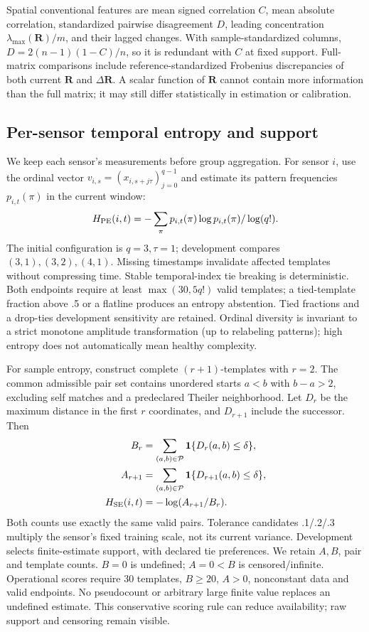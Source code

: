 \documentclass[conference]{IEEEtran}
\newcommand{\R}{\mathbf R}
\begin{document}
Spatial conventional features are mean signed correlation $C$, mean absolute
correlation, standardized pairwise disagreement $D$, leading concentration
$\lambda_{\max}(\R)/m$, and their lagged changes. With sample-standardized
columns, $D=2(n-1)(1-C)/n$, so it is redundant with $C$ at fixed support.
Full-matrix comparisons include reference-standardized Frobenius discrepancies
of both current $\R$ and $\Delta\R$. A scalar function of $\R$ cannot contain
more information than the full matrix; it may still differ statistically in
estimation or calibration.

\subsection{Per-sensor temporal entropy and support}
We keep each sensor's measurements before group aggregation. For sensor $i$,
use the ordinal vector $v_{i,s}=(x_{i,s+j\tau})_{j=0}^{q-1}$ and estimate its
pattern frequencies $p_{i,t}(\pi)$ in the current window:
\begin{equation}
 H_{\rm PE}(i,t)=-\sum_\pi p_{i,t}(\pi)\log p_{i,t}(\pi)/\log(q!).
 \label{eq:pe}
\end{equation}
The initial configuration is $q=3,\tau=1$; development compares $(3,1),(3,2),(4,1)$.
Missing timestamps invalidate affected templates without compressing time.
Stable temporal-index tie breaking is deterministic. Both endpoints require
at least $\max(30,5q!)$ valid templates; a tied-template fraction above .5 or
a flatline produces an entropy abstention. Tied fractions and a drop-ties
development sensitivity are retained. Ordinal diversity is invariant to a
strict monotone amplitude transformation (up to relabeling patterns); high
entropy does not automatically mean healthy complexity.

For sample entropy, construct complete $(r+1)$-templates with $r=2$. The
common admissible pair set contains unordered starts $a<b$ with $b-a>2$,
excluding self matches and a predeclared Theiler neighborhood. Let $D_r$ be
the maximum distance in the first $r$ coordinates, and $D_{r+1}$ include the
successor. Then
\begin{align}
B_r&=\sum_{(a,b)\in\mathcal P}\mathbf1\{D_r(a,b)\leq\delta\},\\
 A_{r+1}&=\sum_{(a,b)\in\mathcal P}\mathbf1\{D_{r+1}(a,b)\leq\delta\},\\
 H_{\rm SE}(i,t)&=-\log(A_{r+1}/B_r).\label{eq:se}
\end{align}
Both counts use exactly the same valid pairs. Tolerance candidates .1/.2/.3
multiply the sensor's fixed training scale, not its current variance. Development
selects finite-estimate support, with declared tie preferences. We retain
$A,B$, pair and template counts. $B=0$ is undefined; $A=0<B$ is censored/infinite.
Operational scores require 30 templates, $B\geq20$, $A>0$, nonconstant data and
valid endpoints. No pseudocount or arbitrary large finite value replaces an
undefined estimate. This conservative scoring rule can reduce availability;
raw support and censoring remain visible.
\end{document}
